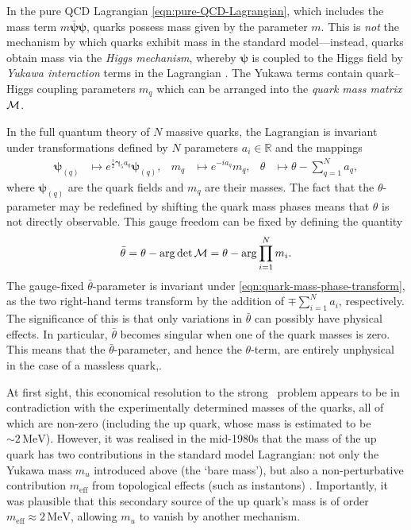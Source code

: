 In the pure QCD Lagrangian \eqref{eqn:pure-QCD-Lagrangian}, which includes the mass term $m\bar{\bm\psi}\bm\psi$, quarks possess mass given by the parameter $m$.
This is \emph{not} the mechanism by which quarks exhibit mass in the standard model---instead, quarks obtain mass via the \emph{Higgs mechanism}, whereby $\bm\psi$ is coupled to the Higgs field by \emph{Yukawa interaction} terms in the Lagrangian \cite[§~7.6.6]{Hamilton_2017}.
The Yukawa terms contain quark--Higgs coupling parameters $m_q$ which can be arranged into the \emph{quark mass matrix} $\cal M$.


In the full quantum theory of $N$ massive quarks, the Lagrangian is invariant under transformations defined by $N$ parameters $a_i \in \mathds{R}$ and the mappings
\begin{align}
	\bm\psi_{(q)} &\mapsto e^{\frac{i}2\bm γ_5a_q}\bm\psi_{(q)}
,&	m_q &\mapsto e^{-ia_q}m_q
,&	\theta &\mapsto \theta - \sum_{q=1}^N a_q
\label{eqn:quark-mass-phase-transform}
,\end{align}
where $\bm\psi_{(q)}$ are the quark fields and $m_q$ are their masses.
The fact that the $\theta$-parameter may be redefined by shifting the quark mass phases means that $\theta$ is not directly observable.
This gauge freedom can be fixed by defining the quantity
\begin{align}
	\bar\theta
	= \theta - \arg\det\cal M
	= \theta - \arg\prod_{i=1}^Nm_i
.\end{align}
The gauge-fixed $\bar\theta$-parameter is invariant under \eqref{eqn:quark-mass-phase-transform}, as the two right-hand terms transform by the addition of $\mp\sum_{i=1}^Na_i$, respectively.
The significance of this is that only variations in $\bar\theta$ can possibly have physical effects.
In particular, $\bar\theta$ becomes singular when one of the quark masses is zero.
This means that the $\bar\theta$-parameter, and hence the $\theta$-term, are entirely unphysical in the case of a massless quark,.

At first sight, this economical resolution to the strong \CP\ problem appears to be in contradiction with the experimentally determined masses of the quarks, all of which are non-zero (including the up quark, whose mass is estimated to be $\sim 2\,\mathrm{MeV}$).
However, it was realised in the mid-1980s that the mass of the up quark has two contributions in the standard model Lagrangian: not only the Yukawa mass $m_u$ introduced above (the `bare mass'), but also a non-perturbative contribution $m_\text{eff}$ from topological effects (such as instantons) \cite{ruling-out-massless-uquark_2020}.
Importantly, it was plausible that this secondary source of the up quark's mass is of order $m_\text{eff} \approx 2\,\mathrm{MeV}$, allowing $m_u$ to vanish by another mechanism.

